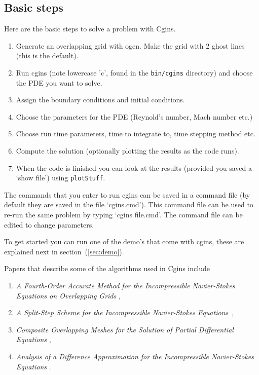 \documentclass{article}
\newcommand{\Index}[1]{#1\index{#1}}
\begin{document}
\subsection{Basic steps}
Here are the basic steps to solve a problem with Cgins.
\begin{enumerate}
  \item Generate an overlapping grid with ogen. Make the grid with 2 ghost lines (this is the default).
  \item Run cgins (note lowercase 'c', found in the {\tt bin/cgins} directory) 
        and choose the PDE you want to solve.
  \item Assign the boundary conditions and initial conditions.
  \item Choose the parameters for the PDE (Reynold's number, Mach number etc.)
  \item Choose run time parameters, time to integrate to, time stepping method etc.
  \item Compute the solution (optionally plotting the results as the code runs).
  \item When the code is finished you can look at the results (provided you saved a
     `show file') using {\tt plotStuff}.
\end{enumerate}
The commands that you enter to run cgins can be saved in a \Index{command file} (by default
they are saved in the file `cgins.cmd'). This command file can be used to re-run
the same problem by typing `cgins file.cmd'. The command file can be edited to change parameters.

To get started you can run one of the demo's that come with cgins, these are 
explained next in section~(\ref{sec:demo}).

Papers that describe some of the \Index{algorithms} used in Cgins include
\begin{enumerate}
  \item {\sl A Fourth-Order Accurate Method for the Incompressible
            {N}avier-{S}tokes Equations on Overlapping Grids} \cite{ICNS},
  \item {\em A Split-Step Scheme for the Incompressible {Navier-Stokes} Equations}~\cite{splitStep2003},
  \item {\sl Composite Overlapping Meshes for the Solution of Partial Differential Equations}
        \cite{CGNS},
  \item {\sl Analysis of a Difference Approximation for the Incompressible
            Navier-Stokes Equations} \cite{INSDIV}.
         
\end{enumerate}
\end{document}

